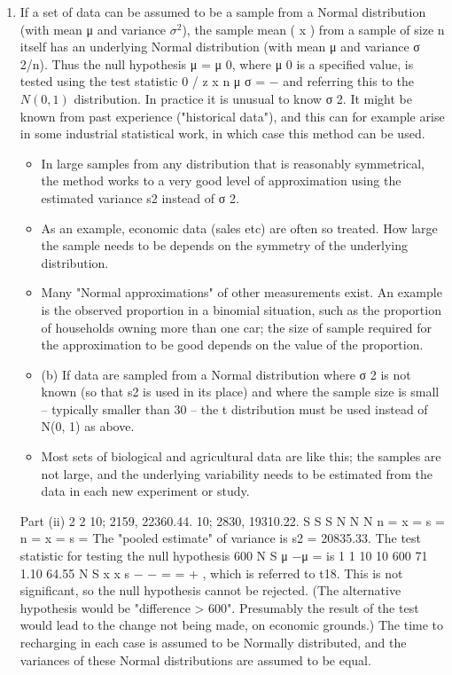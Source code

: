 \documentclass[a4paper,12pt]{article}
\begin{document}
\begin{enumerate}
\item If a set of data can be assumed to be a sample from a Normal distribution
(with mean μ and variance $\sigma^2$), the sample mean ( x ) from a sample of size n itself
has an underlying Normal distribution (with mean μ and variance σ 2/n). Thus the null
hypothesis μ = μ 0, where μ 0 is a specified value, is tested using the test statistic
0
/
z x
n
μ
σ
= −
and referring this to the $N(0, 1)$ distribution.
In practice it is unusual to know σ
2. It might be known from past experience
("historical data"), and this can for example arise in some industrial statistical work, in
which case this method can be used.
\begin{itemize}
    \item In large samples from any distribution that is reasonably symmetrical, the method
works to a very good level of approximation using the estimated variance s2 instead of
σ 2.
\item As an example, economic data (sales etc) are often so treated. How large the
sample needs to be depends on the symmetry of the underlying distribution.
\item Many "Normal approximations" of other measurements exist. An example is the
observed proportion in a binomial situation, such as the proportion of households
owning more than one car; the size of sample required for the approximation to be
good depends on the value of the proportion.
\item (b) If data are sampled from a Normal distribution where σ 2 is not known (so that
s2 is used in its place) and where the sample size is small – typically smaller than 30
– the t distribution must be used instead of N(0, 1) as above. 
\item Most sets of biological
and agricultural data are like this; the samples are not large, and the underlying
variability needs to be estimated from the data in each new experiment or study.
\end{itemize}

Part (ii)
2 2 10; 2159, 22360.44. 10; 2830, 19310.22. S S S N N N n = x = s = n = x = s =
The "pooled estimate" of variance is s2 = 20835.33.
The test statistic for testing the null hypothesis 600 N S μ −μ = is
1 1
10 10
600 71 1.10
64.55
N S x x
s
− − = =
+
,
which is referred to t18. This is not significant, so the null hypothesis cannot be
rejected. (The alternative hypothesis would be "difference > 600". Presumably the
result of the test would lead to the change not being made, on economic grounds.)
The time to recharging in each case is assumed to be Normally distributed, and the
variances of these Normal distributions are assumed to be equal.\end{enumerate}
\end{document}
